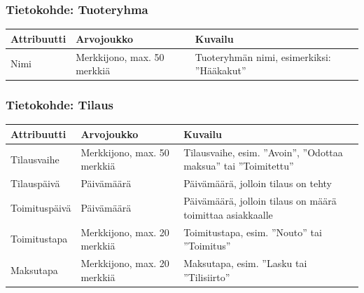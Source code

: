 \documentclass[a4paper,12pt, titlepage]{article}
\begin{document}
\subsubsection*{Tietokohde: Tuoteryhma}
\begin{table}[H]
\begin{tabularx}{\textwidth}{|p{2.5cm}|p{3.5cm}|X|}
\hline
\bf{Attribuutti} & \textbf{Arvojoukko}	& \textbf{Kuvailu}  \\ \hline
Nimi		& Merkkijono, max. 50 merkkiä   & Tuoteryhmän nimi, esimerkiksi: ”Hääkakut” \\ \hline
\end{tabularx}
\end{table}

\subsubsection*{Tietokohde: Tilaus}
\begin{table}[H]
\begin{tabularx}{\textwidth}{|p{2.5cm}|p{3.5cm}|X|}
\hline
\bf{Attribuutti} & \textbf{Arvojoukko}	& \textbf{Kuvailu}  \\ \hline
Tilausvaihe   & Merkkijono, max. 50 merkkiä  & Tilausvaihe, esim. ”Avoin”, ”Odottaa maksua” tai ”Toimitettu” \\ \hline
Tilauspäivä   & Päivämäärä                   & Päivämäärä, jolloin tilaus on tehty                           \\ \hline
Toimituspäivä & Päivämäärä                   & Päivämäärä, jolloin tilaus on määrä toimittaa asiakkaalle     \\ \hline
Toimitustapa  & Merkkijono, max. 20 merkkiä  & Toimitustapa, esim. ”Nouto” tai ”Toimitus”                    \\ \hline
Maksutapa     & Merkkijono, max. 20 merkkiä  & Maksutapa, esim. ”Lasku tai ”Tilisiirto”                      \\ \hline
\end{tabularx}
\end{table}
\end{document}

